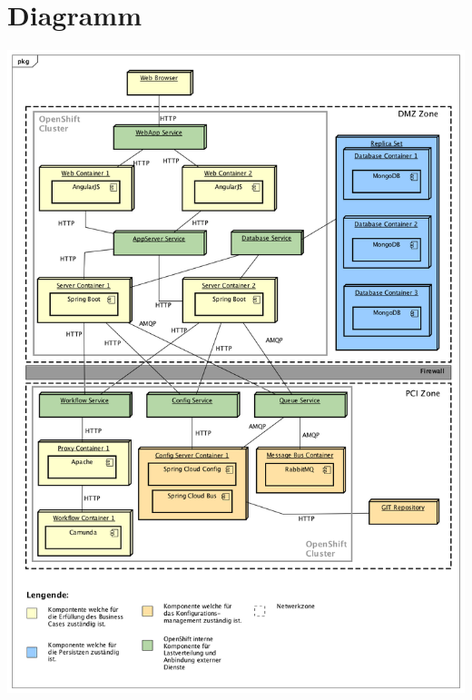 \section{Diagramm}
\label{deploy-dia}
\begin{center}
	\includegraphics[scale=0.45]{OpenShiftDeployment.png}
\end{center}

